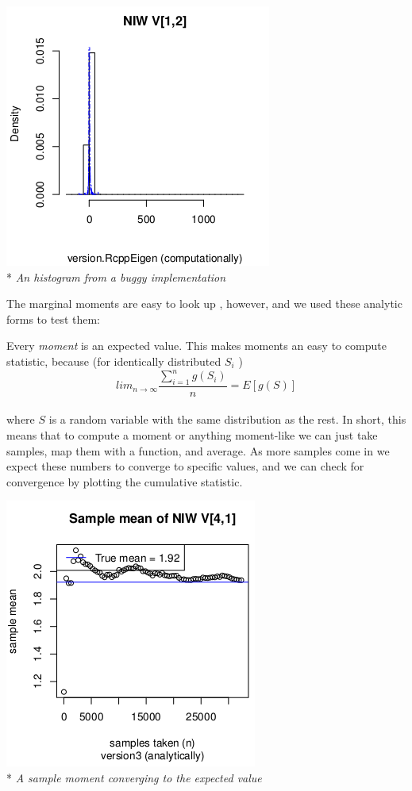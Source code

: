 \documentclass[english]{report}
\begin{document}
\begin{center}
\includegraphics[scale=.8]{densityincorrect.png}\\*
\emph{An histogram from a buggy implementation}
\\  
\end{center}

The marginal moments are easy to look up \cite{Wikipedia1}, however, and we used these analytic forms to test them:

Every \emph{moment} is an expected value. This makes moments an easy to compute statistic,
 because (for identically distributed $ S_i $ )
$$ lim_{n \rightarrow \infty} \frac{\sum_{i=1}^n g(S_i)}{n} = E[g(S)] $$ \\
where $S$ is a random variable with the same distribution as the rest.
In short, this means that to compute a moment or anything moment-like we can just take samples, map them with a function, and average.
As more samples come in we expect these numbers to converge to specific values, and we can check for convergence by plotting the cumulative statistic.


\begin{center}
\includegraphics[scale=.8]{momentcorrect.png}\\*
\emph{A sample moment converging to the expected value}
\end{center}
\end{document}
